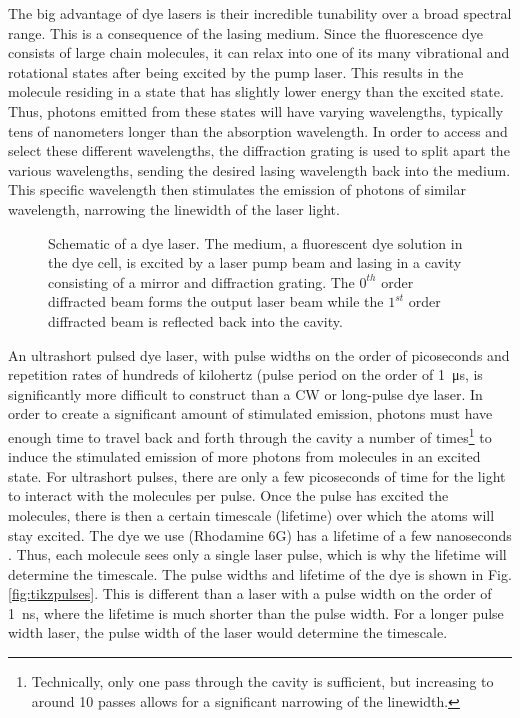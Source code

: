 The big advantage of dye lasers is their incredible tunability over a broad spectral range. This is a consequence of the lasing medium. Since the fluorescence dye consists of large chain molecules, it can relax into one of its many vibrational and rotational states after being excited by the pump laser. This results in the molecule residing in a state that has slightly lower energy than the excited state. Thus, photons emitted from these states will have varying wavelengths, typically tens of nanometers longer than the absorption wavelength. In order to access and select these different wavelengths, the diffraction grating is used to split apart the various wavelengths, sending the desired lasing wavelength back into the medium. This specific wavelength then stimulates the emission of photons of similar wavelength, narrowing the linewidth of the laser light.

\begin{figure}[ht]
	
  \caption{Schematic of a dye laser. The medium, a fluorescent dye solution in the dye cell, is excited by a laser pump beam and lasing in a cavity consisting of a mirror and diffraction grating. The $0^{th}$ order diffracted beam forms the output laser beam while the $1^{st}$ order diffracted beam is reflected back into the cavity.}
  \label{fig:dyelaser}
\end{figure}


An ultrashort pulsed dye laser, with pulse widths on the order of picoseconds and repetition rates of hundreds of kilohertz (pulse period on the order of \SI{1}{\micro \second}, is significantly more difficult to construct than a CW or long-pulse dye laser. In order to create a significant amount of stimulated emission, photons must have enough time to travel back and forth through the cavity a number of times\footnote{Technically, only one pass through the cavity is sufficient, but increasing to around 10 passes allows for a significant narrowing of the linewidth.} to induce the stimulated emission of more photons from molecules in an excited state. For ultrashort pulses, there are only a few picoseconds of time for the light to interact with the molecules per pulse. Once the pulse has excited the molecules, there is then a certain timescale (lifetime) over which the atoms will stay excited. The dye we use (Rhodamine 6G) has a lifetime of a few nanoseconds \cite{Selanger1977}. Thus, each molecule sees only a single laser pulse, which is why the lifetime will determine the timescale. The pulse widths and lifetime of the dye is shown in Fig. \ref{fig:tikzpulses}. This is different than a laser with a pulse width on the order of \SI{1}{\nano \second}, where the lifetime is much shorter than the pulse width. For a longer pulse width laser, the pulse width of the laser would determine the timescale.


